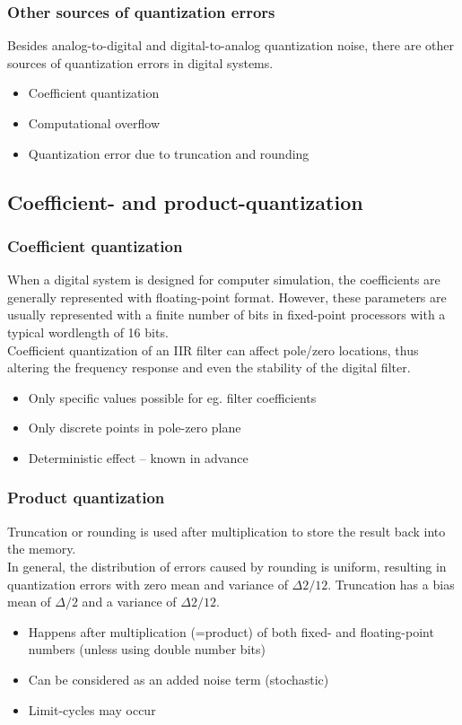 \subsubsection{Other sources of quantization errors}
Besides analog-to-digital and digital-to-analog quantization noise, there are other sources of quantization errors in digital systems.

\begin{itemize}
	\item Coefficient quantization
	\item Computational overflow
	\item Quantization error due to truncation and rounding
\end{itemize}

\subsection{Coefficient- and product-quantization}
\subsubsection{Coefficient quantization}
When a digital system is designed for computer simulation, the coefficients are generally represented with floating-point format. 
However, these parameters are usually represented with a finite number of bits in fixed-point processors with a typical wordlength of 16 bits.\\

Coefficient quantization of an IIR filter can affect pole/zero locations, thus altering the frequency response and even the stability of the digital filter.

\begin{itemize}
	\item Only specific values possible for eg. filter coefficients
	\item Only discrete points in pole-zero plane
	\item Deterministic effect – known in advance
\end{itemize}

\subsubsection{Product quantization}
Truncation or rounding is used after multiplication to store the result back into the memory.\\

In general, the distribution of errors caused by rounding is uniform, resulting in quantization errors with zero mean and variance of $\Delta2/12$. Truncation has a bias mean of $\Delta/2$ and a variance of $\Delta2/12$.
\begin{itemize}
	\item Happens after multiplication (=product) of both fixed- and floating-point numbers (unless	using double number bits)
	\item Can be considered as an added noise term (stochastic)
	\item Limit-cycles may occur
\end{itemize}


